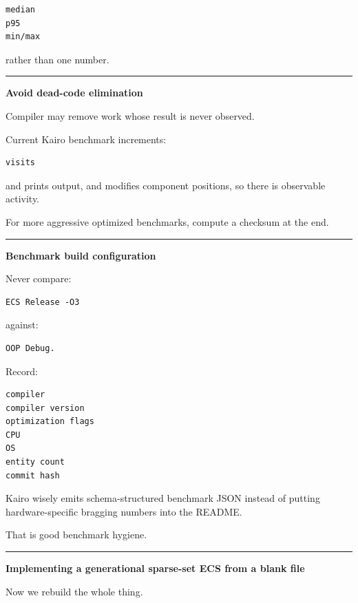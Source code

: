 \begin{verbatim}
median
p95
min/max
\end{verbatim}

rather than one number.

\begin{center}\rule{0.5\linewidth}{0.5pt}\end{center}

\textbf{Avoid dead-code elimination}

Compiler may remove work whose result is never observed.

Current Kairo benchmark increments:

\begin{verbatim}
visits
\end{verbatim}

and prints output, and modifies component positions, so there is observable activity.

For more aggressive optimized benchmarks, compute a checksum at the end.

\begin{center}\rule{0.5\linewidth}{0.5pt}\end{center}

\textbf{Benchmark build configuration}

Never compare:

\begin{verbatim}
ECS Release -O3
\end{verbatim}

against:

\begin{verbatim}
OOP Debug.
\end{verbatim}

Record:

\begin{verbatim}
compiler
compiler version
optimization flags
CPU
OS
entity count
commit hash
\end{verbatim}

Kairo wisely emits schema-structured benchmark JSON instead of putting hardware-specific bragging numbers into the README.

That is good benchmark hygiene.

\begin{center}\rule{0.5\linewidth}{0.5pt}\end{center}

\textbf{Implementing a generational sparse-set ECS from a blank file}

Now we rebuild the whole thing.


